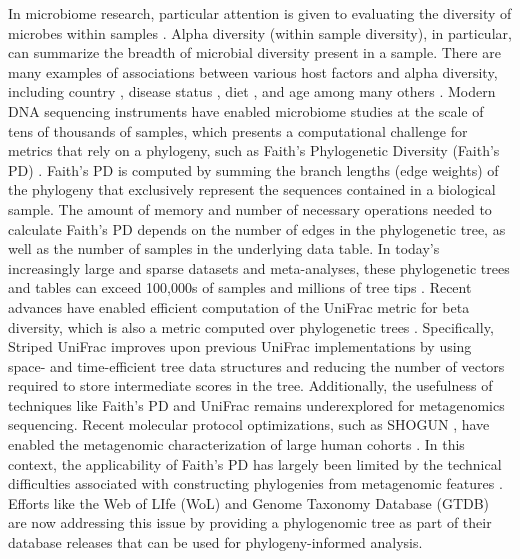 In microbiome research, particular attention is given to evaluating the diversity of microbes within samples \cite{McDonald2018-uf,The_Human_Microbiome_Project_Consortium2012-og,Thompson2017-pu}.  Alpha diversity (within sample diversity), in particular, can summarize the breadth of microbial diversity present in a sample. There are many examples of associations between various host factors and alpha diversity, including country \cite{McDonald2018-uf}, disease status \cite{Gevers2014-bs,Vazquez-Baeza2016-sq}, diet \cite{McDonald2018-uf}, and age \cite{Yatsunenko2012-wv} among many others \cite{Youngblut2019-pk,Jeffery2016-rc}.
Modern DNA sequencing instruments have enabled microbiome studies at the scale of tens of thousands of samples, which presents a computational challenge for metrics that rely on a phylogeny, such as Faith’s Phylogenetic Diversity (Faith’s PD) \cite{Faith1992-gh}. Faith’s PD is computed by summing the branch lengths (edge weights) of the phylogeny that exclusively represent the sequences contained in a biological sample. The amount of memory and number of necessary operations needed to calculate Faith's PD depends on the number of edges in the phylogenetic tree, as well as the number of samples in the underlying data table.
In today’s increasingly large and sparse datasets and meta-analyses, these phylogenetic trees and tables can exceed 100,000s of samples and millions of tree tips \cite{McDonald2018-qq}. Recent advances have enabled efficient computation of the UniFrac metric for beta diversity, which is also a metric computed over phylogenetic trees \cite{Lozupone2005-aj}. Specifically, Striped UniFrac \cite{McDonald2018-qq} improves upon previous UniFrac implementations \cite{Hamady2010-dg} by using space- and time-efficient tree data structures \cite{Cordova2016-vf} and reducing the number of vectors required to store intermediate scores in the tree. 
Additionally, the usefulness of techniques like Faith’s PD and UniFrac remains underexplored for metagenomics sequencing. Recent molecular protocol optimizations, such as SHOGUN \cite{Hillmann2018-vk}, have enabled the metagenomic characterization of large human cohorts  \cite{Salosensaari2020-tx,Borodulin2015-uz,Kaplan2019-yo}. In this context, the applicability of Faith’s PD has largely been limited by the technical difficulties associated with constructing phylogenies from metagenomic features \cite{Zhu2019-od}. Efforts like the Web of LIfe (WoL) \cite{Zhu2019-od} and Genome Taxonomy Database (GTDB) \cite{Parks2020-cg,Parks2018-gb} are now addressing this issue by providing a phylogenomic tree as part of their database releases that can be used for phylogeny-informed analysis.

